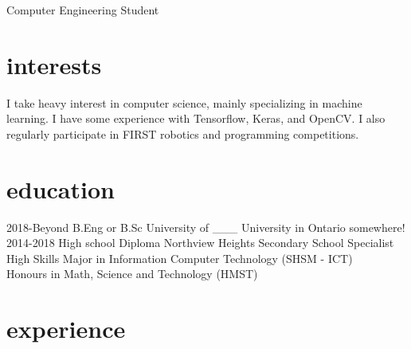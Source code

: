 \documentclass[]{chandan-cv}
\begin{document}
       {Computer Engineering Student}


\section{interests}

I take heavy interest in computer science, mainly specializing in machine learning. I have some experience with Tensorflow, Keras, and OpenCV. I also regularly participate in FIRST robotics and programming competitions.

\section{education}
\begin{entrylist}

\end{entrylist}
\begin{entrylist}
  \entry
    {2018-Beyond}
    {B.Eng or B.Sc {\normalfont University of ___}}
    {University in Ontario somewhere!}
  \entry
    {2014-2018}
    {High school Diploma}
    {Northview Heights Secondary School}
    {Specialist High Skills Major in Information Computer Technology (SHSM - ICT) \\
    Honours in Math, Science and Technology (HMST) }
\end{entrylist}

\section{experience}
\end{document}
